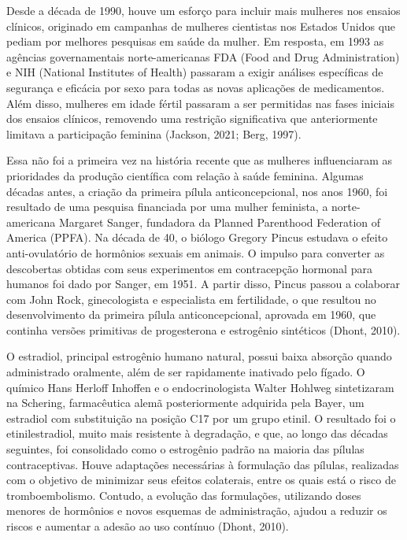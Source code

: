 Desde a década de 1990, houve um esforço para incluir mais mulheres nos ensaios clínicos, originado em campanhas de mulheres cientistas nos Estados Unidos que pediam por melhores pesquisas em saúde da mulher. Em resposta, em 1993 as agências governamentais norte-americanas FDA (Food and Drug Administration) e NIH (National Institutes of Health) passaram a exigir análises específicas de segurança e eficácia por sexo para todas as novas aplicações de medicamentos. Além disso, mulheres em idade fértil passaram a ser permitidas nas fases iniciais dos ensaios clínicos, removendo uma restrição significativa que anteriormente limitava a participação feminina (Jackson, 2021; Berg, 1997).  

Essa não foi a primeira vez na história recente que as mulheres influenciaram as prioridades da produção científica com relação à saúde feminina. Algumas décadas antes, a criação da primeira pílula anticoncepcional, nos anos 1960, foi resultado de uma pesquisa financiada por uma mulher feminista, a norte-americana Margaret Sanger, fundadora da Planned Parenthood Federation of America (PPFA). Na década de 40, o biólogo Gregory Pincus estudava o efeito anti-ovulatório de hormônios sexuais em animais. O impulso para converter as descobertas obtidas com seus experimentos em contracepção hormonal para humanos foi dado por Sanger, em 1951. A partir disso, Pincus passou a colaborar com John Rock, ginecologista e especialista em fertilidade, o que resultou no desenvolvimento da primeira pílula anticoncepcional, aprovada em 1960, que continha versões primitivas de progesterona e estrogênio sintéticos (Dhont, 2010). 

O estradiol, principal estrogênio humano natural, possui baixa absorção quando administrado oralmente, além de ser rapidamente inativado pelo fígado. O químico Hans Herloff Inhoffen e o endocrinologista Walter Hohlweg sintetizaram na Schering, farmacêutica alemã posteriormente adquirida pela Bayer, um estradiol com substituição na posição C17 por um grupo etinil. O resultado foi o etinilestradiol, muito mais resistente à degradação, e que, ao longo das décadas seguintes, foi consolidado como o estrogênio padrão na maioria das pílulas contraceptivas. Houve adaptações necessárias à formulação das pílulas, realizadas com o objetivo de minimizar seus efeitos colaterais, entre os quais está o risco de tromboembolismo. Contudo, a evolução das formulações, utilizando doses menores de hormônios e novos esquemas de administração, ajudou a reduzir os riscos e aumentar a adesão ao uso contínuo (Dhont, 2010).

